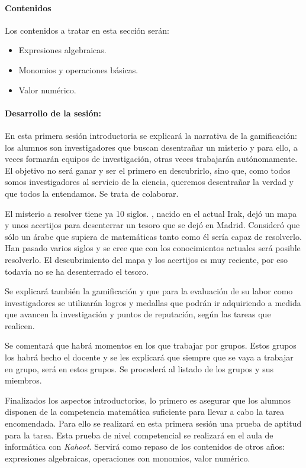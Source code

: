 \paragraph{Contenidos}

Los contenidos a tratar en esta sección serán:

\begin{itemize}
\item Expresiones algebraicas.
\item Monomios y operaciones básicas.
\item Valor numérico.
\end{itemize}

\paragraph{Desarrollo de la sesión: }

En esta primera sesión introductoria se explicará la narrativa de la gamificación: 
%
los alumnos son investigadores que buscan desentrañar un misterio y para ello, a veces formarán equipos de investigación, otras veces trabajarán autónomamente.
%
El objetivo no será ganar y ser el primero en descubrirlo, sino que, como todos somos investigadores al servicio de la ciencia, queremos desentrañar la verdad y que todos la entendamos.
%
Se trata de colaborar.

El misterio a resolver tiene ya 10 siglos.
%
\Arab, nacido en el actual Irak, dejó un mapa y unos acertijos para desenterrar un tesoro que se dejó en Madrid.
%
Consideró que sólo un árabe que supiera de matemáticas tanto como él sería capaz de resolverlo.
%
Han pasado varios siglos y se cree que con los conocimientos actuales será posible resolverlo.
%
El descubrimiento del mapa y los acertijos es muy reciente, por eso todavía no se ha desenterrado el tesoro.

Se explicará también la gamificación y que para la evaluación de su labor como investigadores se utilizarán logros y medallas que podrán ir adquiriendo a medida que avancen la investigación y puntos de reputación, según las tareas que realicen.

Se comentará que habrá momentos en los que trabajar por grupos.
%
Estos grupos los habrá hecho el docente  y se les explicará que siempre que se vaya a trabajar en grupo, será en estos grupos.
%
Se procederá al listado de los grupos y sus miembros.

Finalizados los aspectos introductorios, lo primero es asegurar que los alumnos disponen de la competencia matemática suficiente para llevar a cabo la tarea encomendada.
%
Para ello se realizará en esta primera sesión una prueba de aptitud para la tarea.
%
Esta prueba de nivel competencial se realizará en el aula de informática con \textit{Kahoot}.
%
Servirá como repaso de los contenidos de otros años: expresiones algebraicas, operaciones con monomios, valor numérico.

